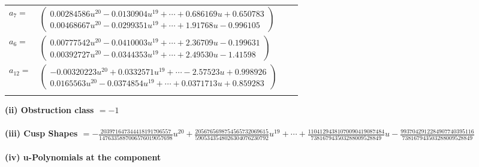 \documentclass[1p]{elsarticle_modified}
\theoremstyle{definition}
\begin{document}
\begin{tabular}{m{7pt} m{180pt} m{7pt} m{180pt} }
\flushright $a_{7}=$&$\begin{pmatrix}0.00284586 u^{20}-0.0130904 u^{19}+\cdots+0.686169 u+0.650783\\0.00468667 u^{20}-0.0299351 u^{19}+\cdots+1.91768 u-0.996105\end{pmatrix}$ \\
\flushright $a_{6}=$&$\begin{pmatrix}0.00777542 u^{20}-0.0410003 u^{19}+\cdots+2.36709 u-0.199631\\0.00392727 u^{20}-0.0344353 u^{19}+\cdots+2.49530 u-1.41598\end{pmatrix}$ \\
\flushright $a_{12}=$&$\begin{pmatrix}-0.00320223 u^{20}+0.0332571 u^{19}+\cdots-2.57523 u+0.998926\\0.0165563 u^{20}-0.0374854 u^{19}+\cdots+0.0371713 u+0.859283\end{pmatrix}$\\&\end{tabular}
\flushleft \textbf{(ii) Obstruction class $= -1$}\\~\\
\flushleft \textbf{(iii) Cusp Shapes $= -\frac{203971647344418191706557}{1476335887006576019057698} u^{20}+\frac{2056765698754565732069615}{5905343548026304076230792} u^{19}+\cdots+\frac{11041294381070090419087484}{738167943503288009528849} u-\frac{9937042912284907740395116}{738167943503288009528849}$}\\~\\
\newpage\renewcommand{\arraystretch}{1}
\flushleft \textbf{(iv) u-Polynomials at the component}\newline \\
\end{document}
